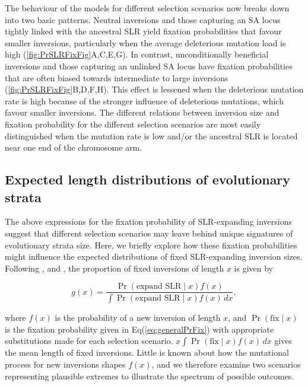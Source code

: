 \documentclass{article}[12pt]
\begin{document}
The behaviour of the models for different selection scenarios now breaks down into two basic patterns. Neutral inversions and those capturing an SA locus tightly linked with the ancestral SLR yield fixation probabilities that favour smaller inversions, particularly when the average deleterious mutation load is high (\ref{fig:PrSLRFixFig}A,C,E,G). In contrast, unconditionally beneficial inversions and those capturing an unlinked SA locus have fixation probabilities that are often biased towards intermediate to large inversions (\ref{fig:PrSLRFixFig}B,D,F,H). This effect is lessened when the deleterious mutation rate is high because of the stronger influence of deleterious mutations, which favour smaller inversions. The different relations between inversion size and fixation probability for the different selection scenarios are most easily distinguished when the mutation rate is low and/or the ancestral SLR is located near one end of the chromosome arm.






\subsection*{Expected length distributions of evolutionary strata} \label{subsec:DistFixedInv}

The above expressions for the fixation probability of SLR-expanding inversions suggest that different selection scenarios may leave behind unique signatures of evolutionary strata size. Here, we briefly explore how these fixation probabilities might influence the expected distributions of fixed SLR-expanding inversion sizes. Following \citet{vanValenLevins1968, Santos1986}, and \citet{ConnallonOlito2021}, the proportion of fixed inversions of length $x$ is given by 
\begin{linenomath*}
\begin{equation} \label{eq:generalInvSizeModel}
  g(x) = \frac{\Pr(\text{expand SLR} \mid x) f(x)} {\int \Pr(\text{expand SLR} \mid x) f(x)\,dx},
\end{equation}
\end{linenomath*}

\noindent where $f(x)$ is the probability of a new inversion of length $x$, and $\Pr(\text{fix} \mid x)$ is the fixation probability given in Eq(\ref{eq:generalPrFix}) with appropriate substitutions made for each selection scenario. $x\int \Pr(\text{fix} \mid x) f(x)\,dx$ gives the mean length of fixed inversions. Little is known about how the mutational process for new inversions shapes $f(x)$, and we therefore examine two scenarios representing plausible extremes to illustrate the spectrum of possible outcomes.
\end{document}
